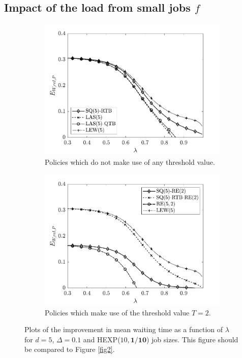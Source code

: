 \documentclass[12pt]{report}
\begin{document}
\subsection{Impact of the load from small jobs $f$}
\begin{figure}[t]
\begin{center}
\begin{subfigure}{0.43\textwidth}
\centering
\captionsetup{width=.8\linewidth}
\includegraphics[width=1\linewidth]{figures/Chapter7/fig8a.pdf}
\caption{Policies which do not make use of any threshold value.}
\label{fig8a}
\end{subfigure}
\begin{subfigure}{.43\textwidth}
\centering
\captionsetup{width=.8\linewidth}
\includegraphics[width=1\linewidth]{figures/Chapter7/fig8b.pdf}
\caption{Policies which make use of the threshold value $T=2$.}
\label{fig8b}
\end{subfigure}
\caption{Plots of the improvement in mean waiting time as a function of $\lambda$ for $d=5$, $\Delta=0.1$ and HEXP($10,\textbf{1/10}$) job sizes. This figure should be compared to Figure \ref{fig2}.}
\label{fig8}
\end{center}
\end{figure}
\end{document}

